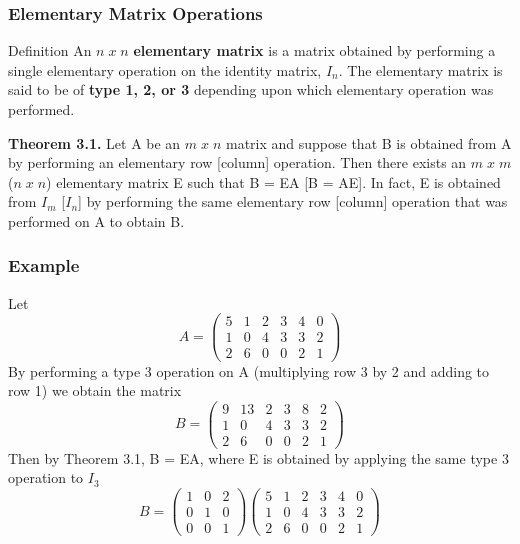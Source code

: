 \documentclass[11pt]{beamer}
\begin{document}
\begin{frame}
	\frametitle{Elementary Matrix Operations}
	\begin{block}{Definition}
		An $n \; x \; n$ \textbf{elementary matrix} is a matrix obtained by performing a single  elementary operation on the identity matrix, $I_{n}$. The elementary matrix is said to be of \textbf{type 1, 2, or 3} depending upon which elementary operation was performed.
	\end{block}
	\phantom{text}
	
	\textbf{Theorem 3.1.} Let A be an $m \; x \; n$ matrix and suppose that B is obtained from A by performing an elementary row [column] operation. Then there exists an $m \; x \; m$ ($n \; x \; n$) elementary matrix E such that B = EA [B = AE]. In fact, E is obtained from $I_{m}$ [$I_{n}$] by performing the same elementary row [column] operation that was performed on A to obtain B.
\end{frame}

\begin{frame}
	\frametitle{Example}
	Let
	\[ A = 
		\begin{pmatrix}
			5 & 1 & 2 & 3 & 4 & 0 \\
			1 & 0 & 4 & 3 & 3 & 2 \\
			2 & 6 & 0 & 0 & 2 & 1
		\end{pmatrix}
	\]
	By performing a type 3 operation on A (multiplying row 3 by 2 and adding to row 1) we obtain the matrix
	\[ B = 
		\begin{pmatrix}
			9 & 13 & 2 & 3 & 8 & 2 \\
			1 & 0 & 4 & 3 & 3 & 2 \\
			2 & 6 & 0 & 0 & 2 & 1
		\end{pmatrix}
	\]
	Then by Theorem 3.1, B = EA, where E is obtained by applying the same type 3 operation to $I_{3}$
	\[ B = 
	\begin{pmatrix}
		1 & 0 & 2 \\
		0 & 1 & 0 \\
		0 & 0 & 1
	\end{pmatrix}
	\begin{pmatrix}
		5 & 1 & 2 & 3 & 4 & 0 \\
		1 & 0 & 4 & 3 & 3 & 2 \\
		2 & 6 & 0 & 0 & 2 & 1
	\end{pmatrix}
	\]
\end{frame}
\end{document}

